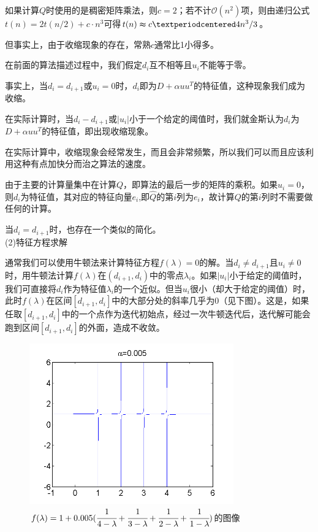 \documentclass[12pt,a4paper]{article}
\begin{document}
如果计算$Q$时使用的是稠密矩阵乘法，则$c=2$；若不计$\mathcal{O} (n^2)$项，则由递归公式$t(n)=2t(n/2)+c·n^3$可得$t(n)\thickapprox c·4n^3/3$。

但事实上，由于收缩现象的存在，常熟$c$通常比1小得多。

在前面的算法描述过程中，我们假定$d_i$互不相等且$u_i$不能等于零。

事实上，当$d_i=d_{i+1}$或$u_i=0$时，$d_i$即为$D+\alpha uu^T$的特征值，这种现象我们成为收缩。

在实际计算时，当$d_i-d_{i+1}$或$|u_i|$小于一个给定的阈值时，我们就金斯认为$d_i$为$D+\alpha uu^T$的特征值，即出现收缩现象。

在实际计算中，收缩现象会经常发生，而且会非常频繁，所以我们可以而且应该利用这种有点加快分而治之算法的速度。

由于主要的计算量集中在计算$Q$，即算法的最后一步的矩阵的乘积。如果$u_i=0$，则$d_i$为特征值，其对应的特征向量$e_i$,即$\hat{Q}$的第$i$列为$e_i$，故计算$Q$的第$i$列时不需要做任何的计算。

当$d_i=d_{i+1}$时，也存在一个类似的简化。\\
(2)特征方程求解

通常我们可以使用牛顿法来计算特征方程$f(\lambda)=0$的解。当$d_i\neq d_{i+1}$且$u_i\neq 0$时，用牛顿法计算$f(\lambda)$在$(d_{i+1},d_i)$中的零点$\lambda _i$。如果$|u_i|$小于给定的阈值时，我们可直接将$d_i$作为特征值$\lambda _i$的一个近似。但当$u_i$很小（却大于给定的阈值）时，此时$f(\lambda)$在区间$[d_{i+1},d_i]$中的大部分处的斜率几乎为0（见下图）。这是，如果任取$[d_{i+1},d_i]$中的一个点作为迭代初始点，经过一次牛顿迭代后，迭代解可能会跑到区间$[d_{i+1},d_i]$的外面，造成不收敛。
\begin{figure}[H]
	\centering
	\includegraphics[scale=1]{figurest/figure_3.png}
	\caption{$f(\lambda)=1+0.005(\cfrac{1}{4-\lambda}+\cfrac{1}{3-\lambda}+\cfrac{1}{2-\lambda}+\cfrac{1}{1-\lambda})$的图像}
\end{figure}
\end{document}
